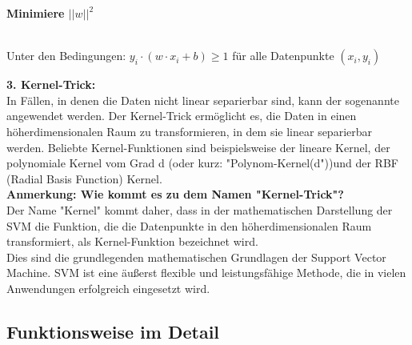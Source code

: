\documentclass[12pt]{article}
\begin{document}
\begin{center}
\begin{large} \textbf{Minimiere $||w||^2$} \end{large} \\
Unter den Bedingungen: $y_i \cdot (w \cdot x_i + b) \geq 1$ für alle Datenpunkte ${(x_i,y_i)}$
\end{center}
\textbf{3. Kernel-Trick:}\\
In Fällen, in denen die Daten nicht linear separierbar sind, kann der sogenannte  {\color{blue}{Kernel-Trick}}  angewendet werden. Der Kernel-Trick ermöglicht es, die Daten in einen höherdimensionalen Raum zu transformieren, in dem sie linear separierbar werden. Beliebte Kernel-Funktionen sind beispielsweise der lineare Kernel, der polynomiale Kernel vom Grad d (oder kurz: "Polynom-Kernel(d"))und der RBF (Radial Basis Function) Kernel.\\
%
\textbf{Anmerkung: Wie kommt es zu dem Namen "Kernel-Trick"?}\\
Der Name "Kernel" kommt daher, dass in der mathematischen Darstellung der SVM die Funktion, die die Datenpunkte in den höherdimensionalen Raum transformiert, als Kernel-Funktion bezeichnet wird.\\
%
Dies sind die grundlegenden mathematischen Grundlagen der Support Vector Machine. SVM ist eine äußerst flexible und leistungsfähige Methode, die in vielen Anwendungen erfolgreich eingesetzt wird.\\
%


\subsection{Funktionsweise im Detail}
\end{document}
